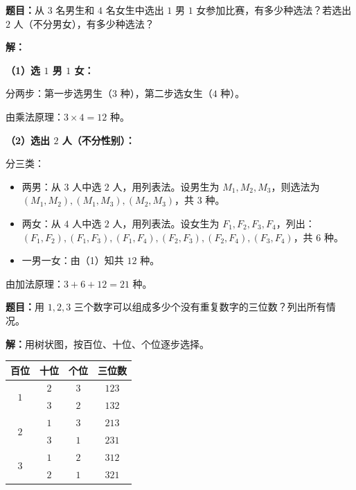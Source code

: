 \documentclass[12pt, a4paper]{ctexart}
\begin{document}
\begin{examplebox}[【例15】加法原理与乘法原理]
\textbf{题目：}从 $3$ 名男生和 $4$ 名女生中选出 $1$ 男 $1$ 女参加比赛，有多少种选法？若选出 $2$ 人（不分男女），有多少种选法？
\end{examplebox}

\textbf{解：}\;

\textbf{（1）选 $1$ 男 $1$ 女：}

分两步：第一步选男生（$3$ 种），第二步选女生（$4$ 种）。

由乘法原理：$3\times 4=\boxed{12}$ 种。

\textbf{（2）选出 $2$ 人（不分性别）：}

分三类：
\begin{itemize}[itemsep=1pt]
  \item 两男：从 $3$ 人中选 $2$ 人，用列表法。设男生为 $M_1,M_2,M_3$，则选法为 $(M_1,M_2),(M_1,M_3),(M_2,M_3)$，共 $3$ 种。
  \item 两女：从 $4$ 人中选 $2$ 人，用列表法。设女生为 $F_1,F_2,F_3,F_4$，列出：$(F_1,F_2),(F_1,F_3),(F_1,F_4),(F_2,F_3),(F_2,F_4),(F_3,F_4)$，共 $6$ 种。
  \item 一男一女：由（1）知共 $12$ 种。
\end{itemize}
由加法原理：$3+6+12=\boxed{21}$ 种。

\begin{examplebox}[【例16】树状图法]
\textbf{题目：}用 $1,2,3$ 三个数字可以组成多少个没有重复数字的三位数？列出所有情况。
\end{examplebox}

\textbf{解：}\;用树状图，按百位、十位、个位逐步选择。

\begin{center}
\renewcommand{\arraystretch}{1.2}
\begin{tabular}{c c c | c}
百位 & 十位 & 个位 & 三位数 \\
\hline
\multirow{2}{*}{$1$} & $2$ & $3$ & $123$ \\
                       & $3$ & $2$ & $132$ \\
\hline
\multirow{2}{*}{$2$} & $1$ & $3$ & $213$ \\
                       & $3$ & $1$ & $231$ \\
\hline
\multirow{2}{*}{$3$} & $1$ & $2$ & $312$ \\
                       & $2$ & $1$ & $321$ \\
\end{tabular}
\end{center}
\end{document}
